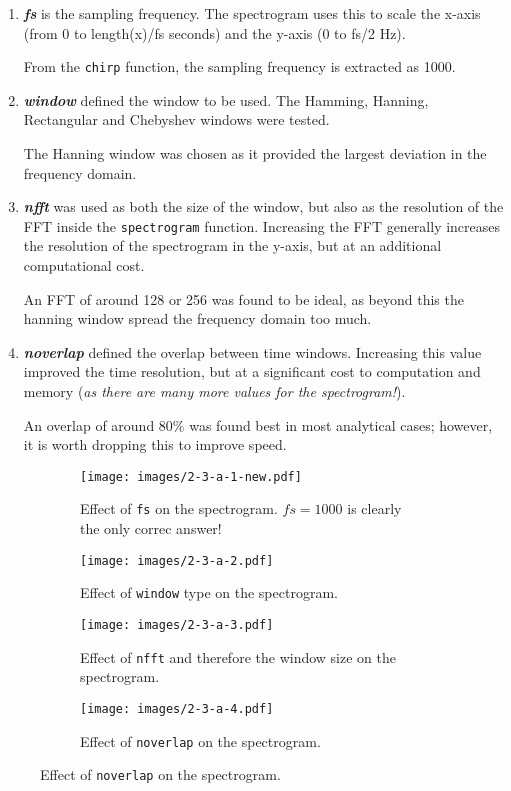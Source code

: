 \documentclass[main.tex]{subfiles}
\begin{document}
\begin{enumerate}
	\item \textbf{\textit{fs}} is the sampling frequency. The spectrogram uses this to scale the x-axis (from 0 to length(x)/fs seconds) and the y-axis (0 to fs/2 Hz). 
	
	From the {\tt chirp} function, the sampling frequency is extracted as 1000. 
	
	\item \textbf{\textit{window}} defined the window to be used. The Hamming, Hanning, Rectangular and Chebyshev windows were tested.
	
	The Hanning window was chosen as it provided the largest deviation in the frequency domain. 
	
	\item \textbf{\textit{nfft}} was used as both the size of the window, but also as the resolution of the FFT inside the {\tt spectrogram} function. Increasing the FFT generally increases the resolution of the spectrogram in the y-axis, but at an additional computational cost.
	
	An FFT of around 128 or 256 was found to be ideal, as beyond this the hanning window spread the frequency domain too much.
	
	\item \textbf{\textit{noverlap}} defined the overlap between time windows. Increasing this value improved the time resolution, but at a significant cost to computation and memory (\textit{as there are many more values for the spectrogram!}).
	
	An overlap of around $80\%$ was found best in most analytical cases; however, it is worth dropping this to improve speed.
\end{enumerate}

\begin{figure}[h]
	\centering
	\begin{subfigure}[b]{\textwidth}
		\centering
		\texttt{[image: images/2-3-a-1-new.pdf]}
		\caption{Effect of {\tt fs} on the spectrogram. $fs=1000$ is clearly the only correc answer!}
		\label{fig:2-3-a-1}
	\end{subfigure}%
	
	\begin{subfigure}[b]{\textwidth}
		\centering
		\texttt{[image: images/2-3-a-2.pdf]}
		\caption{Effect of {\tt window} type on the spectrogram.}
		\label{fig:2-3-a-2}
	\end{subfigure}
	
	\begin{subfigure}[b]{\textwidth}
		\centering
		\texttt{[image: images/2-3-a-3.pdf]}
		\caption{Effect of {\tt nfft} and therefore the window size on the spectrogram.}
		\label{fig:2-3-a-3}
	\end{subfigure}
	
	\begin{subfigure}[b]{\textwidth}
		\centering
		\texttt{[image: images/2-3-a-4.pdf]}
		\caption{Effect of {\tt noverlap} on the spectrogram.}
		\label{fig:2-3-a-4}
	\end{subfigure}
	\label{fig:2-3-a}
\end{figure}
\end{document}
